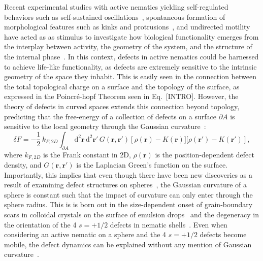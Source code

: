 Recent experimental studies with active nematics yielding self-regulated behaviors such as self-sustained oscillations~\cite{RN9}, spontaneous formation of morphological features such as kinks and protrusions~\cite{RN9,RN3}, and undirected motility~\cite{RN9,RN3} have acted as as stimulus to investigate how biological functionality emerges from the interplay between activity, the geometry of the system, and the structure of the internal phase~\cite{RN160,RN51,RN10}.
In this context, defects in active nematics could be harnessed to achieve life-like functionality, as defects are extremely sensitive to the intrinsic geometry of the space they inhabit.
This is easily seen in the connection between the total topological charge on a surface and the topology of the surface, as expressed in the Poincr\'e-hopf Theorem seen in Eq.~[INTRO].
However, the theory of defects in curved spaces extends this connection beyond topology, predicting that the free-energy of a collection of defects on a surface $\partial A$ is sensitive to the local geometry through the Gaussian curvature~\cite{RN42}:
\begin{equation}
  \delta F = -\frac{1}{2}\,k_{F, 2D}\int_{\partial A} \textrm{d}^2\mathbf{r}\,\textrm{d}^2\mathbf{r}'\, G(\mathbf{r},\mathbf{r}') \left[\rho(\mathbf{r})-K(\mathbf{r})] [\rho(\mathbf{r}')-K(\mathbf{r}')\right],\label{e:3-DefectsCurvedSurf}
\end{equation}
where $k_{F, 2D}$ is the Frank constant in 2D, $\rho(\mathbf{r})$ is the position-dependent defect density, and $G(\mathbf{r},\mathbf{r}')$ is the Laplacian Green's function on the surface.
Importantly, this implies that even though there have been new discoveries as a result of examining defect structures on spheres~\cite{RN45,RN106,RN26,RN110,RN105,RN76,RN101,RN165}, the Gaussian curvature of a sphere is constant such that the impact of curvature can only enter through the sphere radius.
This is is born out in the size-dependent onset of grain-boundary scars in colloidal crystals on the surface of emulsion drops~\cite{RN26,RN110} and the degeneracy in the orientation of the 4 $s = +1/2$ defects in nematic shells~\cite{RN45}.
Even when considering an active nematic on a sphere and the 4 $s = +1/2$ defects become mobile, the defect dynamics can be explained without any mention of Gaussian curvature~\cite{RN9}. \\


